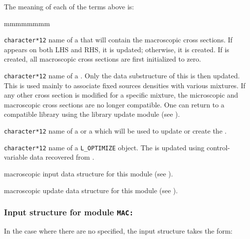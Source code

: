 \noindent
The meaning of each of the terms above is:

\noindent

\begin{ListeDeDescription}{mmmmmmmm}

\item[\dusa{MACLIB}] {\tt character*12} name of a  that will
contain the macroscopic cross sections. If  appears on both LHS and
RHS, it is updated; otherwise, it is created. If  is created, all
macroscopic cross sections are first initialized to zero.

\item[\dusa{MICLIB}] {\tt character*12} name of a . Only the
 data substructure of this  is then updated. This is
used mainly to associate fixed sources densities with various mixtures. If any
other cross section is modified for a specific mixture, the
microscopic and macroscopic cross sections are no longer compatible. One can
return to a compatible library using the library update module (see
).

\item[\dusa{OLDLIB}] {\tt character*12} name of a  or a 
which will be used to update or create the  .

\item[\dusa{OPTIM}] {\tt character*12} name of a {\tt L\_OPTIMIZE} object. The
  is updated using control-variable data recovered from .

\item[\dstr{descmacinp}] macroscopic input data structure for this module (see
).

\item[\dstr{descmacupd}] macroscopic update data structure for this module (see
).

\end{ListeDeDescription}

\subsubsection{Input structure for module {\tt MAC:}}\label{sect:descmacinp}
 
In the case where there are no  specified, the  input structure takes
the form:

